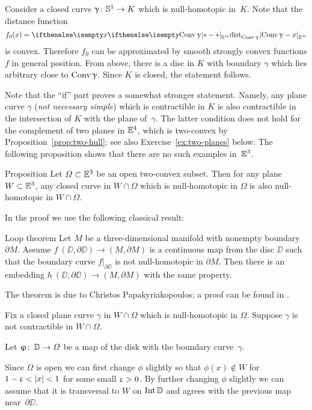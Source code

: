 Consider a closed curve $\gamma\:\SS^1\to K$ which is null-homotopic in~$K$.
Note that the distance function \[f_0(x)\z=\dist{\Conv\gamma}{x}{\EE^m}\] 
is convex.
Therefore $f_0$ can be approximated by smooth strongly convex functions $f$ in general position.
From above, there is a disc in $K$ with boundary $\gamma$
which lies arbitrary close to $\mathop{\rm Conv}\nolimits\upgamma$.
Since $K$ is closed, the statement follows.
\qeds

Note that the ``if'' part proves a somewhat stronger statement.
Namely,  any plane curve $\gamma$ (\emph{not necessary simple}) which is  contractible in $K$ is also contractible in the intersection of $K$ with the plane of~$\gamma$.
The latter condition does not hold for the complement 
of two planes in $\mathbb{E}^4$, which is two-convex by Proposition~\ref{prop:two-hull};
see also Exercise~\ref{ex:two-planes} below.
The following proposition shows that there are no such examples in~$\mathbb{E}^3$.

\begin{thm}{Proposition}\label{prop:3d-strong-2-convexity}
Let $\Omega\subset\EE^3$ be an open two-convex subset.
Then for any plane $W\subset\EE^3$, 
any closed curve in $W\cap \Omega$ 
which is null-homotopic in $\Omega$ is also null-homotopic in $W\cap \Omega$.
\end{thm}

In the proof we use the following classical result:

\begin{thm}{Loop theorem}
Let $M$ be a three-dimensional manifold with nonempty boundary $\partial M$.
Assume 
$f\: (\DD,\partial \DD)\to (M,\partial M)$
is a continuous map from the disc $\DD$ such that the boundary curve $f|_{\partial \DD}$ is not null-homotopic in $\partial M$.  Then there is an embedding 
$h\: (\DD,\partial \DD)\to (M,\partial M)$ 
with the same property.
\end{thm}

The theorem is due to Christos Papakyriakopoulos; a proof can be found in \cite{hatcher}. 

Fix a closed plane curve $\gamma$ in $W\cap \Omega$ which is null-homotopic in $\Omega$. Suppose $\gamma$ is not contractible in  $W\cap \Omega$.

Let $\phi\co \DD\to\Omega$ be a map of the disk with the boundary curve~$\gamma$.

Since $\Omega$ is open we can first change  $\phi$  slightly so that $\phi(x)\notin W$ for $1-\eps<|x|<1$ for some small $\upvarepsilon>0$.
By further changing $\phi$ slightly we can assume that it is transversal to $W$  on  $\mathop{\rm Int}\nolimits \mathbb{D}$ and agrees with the previous map near~$\partial \DD$.


